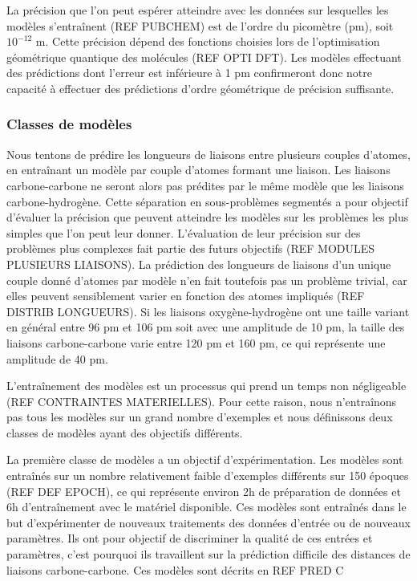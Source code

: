 \par La précision que l'on peut espérer atteindre avec les données sur lesquelles les modèles s'entraînent (REF PUBCHEM) est de l'ordre du picomètre (pm), soit $10^{-12}$ m. Cette précision dépend des fonctions choisies lors de l'optimisation géométrique quantique des molécules (REF OPTI DFT). Les modèles effectuant des prédictions dont l'erreur est inférieure à 1 pm confirmeront donc notre capacité à effectuer des prédictions d'ordre géométrique de précision suffisante.

\subsubsection{Classes de modèles}
\par Nous tentons de prédire les longueurs de liaisons entre plusieurs couples d'atomes, en entraînant un modèle par couple d'atomes formant une liaison. Les liaisons carbone-carbone ne seront alors pas prédites par le même modèle que les liaisons carbone-hydrogène. Cette séparation en sous-problèmes segmentés a pour objectif d'évaluer la précision que peuvent atteindre les modèles sur les problèmes les plus simples que l'on peut leur donner. L'évaluation de leur précision sur des problèmes plus complexes fait partie des futurs objectifs (REF	MODULES PLUSIEURS LIAISONS). La prédiction des longueurs de liaisons d'un unique couple donné d'atomes par modèle n'en fait toutefois pas un problème trivial, car elles peuvent sensiblement varier en fonction des atomes impliqués (REF DISTRIB LONGUEURS). Si les liaisons oxygène-hydrogène ont une taille variant en général entre 96 pm et 106 pm soit avec une amplitude de 10 pm, la taille des liaisons carbone-carbone varie entre 120 pm et 160 pm, ce qui représente une amplitude de 40 pm. \\
\par L'entraînement des modèles est un processus qui prend un temps non négligeable (REF CONTRAINTES MATERIELLES). Pour cette raison, nous n'entraînons pas tous les modèles sur un grand nombre d'exemples et nous définissons deux classes de modèles ayant des objectifs différents. \\
\par La première classe de modèles a un objectif d'expérimentation. Les modèles sont entraînés sur un nombre relativement faible d'exemples différents sur 150 époques (REF DEF EPOCH), ce qui représente environ 2h de préparation de données et 6h d'entraînement avec le matériel disponible. Ces modèles sont entraînés dans le but d'expérimenter de nouveaux traitements des données d'entrée ou de nouveaux paramètres. Ils ont pour objectif de discriminer la qualité de ces entrées et paramètres, c'est pourquoi ils travaillent sur la prédiction difficile des distances de liaisons carbone-carbone. Ces modèles sont décrits en REF PRED C\\
